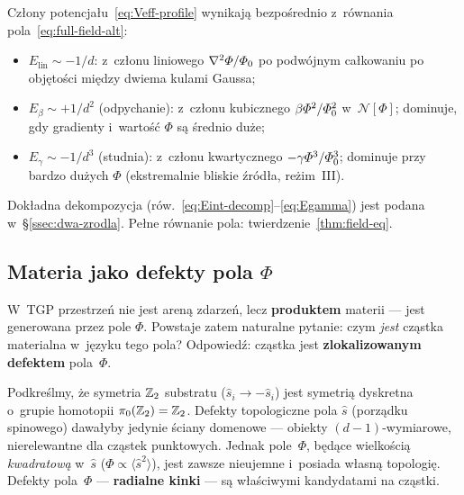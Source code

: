 \begin{remark}\label{rem:Veff-field-eq}
Cz\l{}ony potencja\l{}u~\eqref{eq:Veff-profile} wynikaj\k{a} bezpo\'srednio
z~r\'ownania pola~\eqref{eq:full-field-alt}:
\begin{itemize}[nosep]
  \item $E_{\mathrm{lin}} \sim -1/d$: z~cz\l{}onu liniowego
    $\nabla^2\varPhi/\varPhi_0$ po podw\'ojnym ca\l{}kowaniu
    po obj\k{e}to\'sci mi\k{e}dzy dwiema kulami Gaussa;
  \item $E_\beta \sim +1/d^2$ (odpychanie): z~cz\l{}onu kubicznego
    $\beta\varPhi^2/\varPhi_0^2$ w~$\mathcal{N}[\Phi]$; dominuje,
    gdy gradienty i~warto\'s\'c $\Phi$ s\k{a} \'srednio du\.ze;
  \item $E_\gamma \sim -1/d^3$ (studnia): z~cz\l{}onu kwartycznego
    $-\gamma\varPhi^3/\varPhi_0^3$; dominuje przy bardzo du\.zych $\Phi$
    (ekstremalnie bliskie \'zr\'od\l{}a, re\.zim~III).
\end{itemize}
Dok\l{}adna dekompozycja (rów.~\ref{eq:Eint-decomp}--\ref{eq:Egamma})
jest podana w~\S\ref{ssec:dwa-zrodla}.
Pe\l{}ne r\'ownanie pola: twierdzenie~\ref{thm:field-eq}.
\end{remark}

\subsection{Materia jako defekty pola $\Phi$}\label{ssec:defekty}

W~TGP przestrze\'n nie jest aren\k{a} zdarze\'n, lecz \textbf{produktem}
materii --- jest generowana przez pole $\Phi$. Powstaje zatem
naturalne pytanie: czym \emph{jest} cz\k{a}stka materialna
w~j\k{e}zyku tego pola? Odpowied\'z: cz\k{a}stka jest
\textbf{zlokalizowanym defektem} pola~$\Phi$.

Podkre\'slmy, \.ze symetria $\mathbb{Z}_2$ substratu ($\hat{s}_i \to -\hat{s}_i$)
jest symetri\k{a} dyskretna o~grupie homotopii $\pi_0(\mathbb{Z}_2)=\mathbb{Z}_2$.
Defekty topologiczne pola $\hat{s}$ (porz\k{a}dku spinowego) dawa\l{}yby
jedynie \'sciany domenowe --- obiekty $(d{-}1)$-wymiarowe,
nierelewantne dla cz\k{a}stek punktowych. Jednak pole~$\Phi$,
b\k{e}d\k{a}ce wielko\'sci\k{a} \emph{kwadratow\k{a}} w~$\hat{s}$
($\Phi \propto \langle\hat{s}^2\rangle$), jest zawsze nieujemne
i~posiada w\l{}asn\k{a} topologi\k{e}. Defekty pola~$\Phi$ ---
\textbf{radialne kinki} --- s\k{a} w\l{}a\'sciwymi kandydatami
na cz\k{a}stki.

